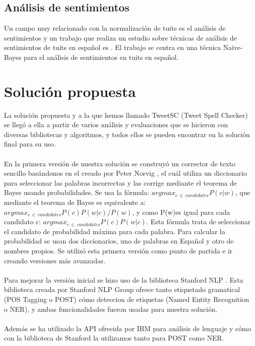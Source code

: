 \documentclass[spanish,12pt, a4paper,twoside]{paper}
\let\oldsection\section
\def\section{\cleardoublepage\oldsection}
\begin{document}
\subsection{Análisis de sentimientos}\label{analisisdesentimientos}
Un campo muy relacionado con la normalización de tuits es el análisis de sentimientos y un trabajo que realiza un estudio sobre técnicas de análisis de sentimientos de tuits en español es \cite{fernandezanta:2013}. El trabajo \cite{gamallo:2013} se centra en una técnica Naive-Bayes para el análisis de sentimientos en tuits en español.

\section{Solución propuesta}\label{sec:solucionpropuesta}
La solución propuesta y a la que hemos llamado TweetSC (Tweet Spell Checker) \cite{tweetscweb} se llegó a ella a partir de varios análisis y evaluaciones que se hicieron con diversas bibliotecas y algoritmos, y todos ellos se pueden encontrar en la solución final para su uso.\\\\
En la primera versión de nuestra solución se construyó un corrector de texto sencillo basándonos en el creado por Peter Norvig \cite{peternorvig}, el cuál utiliza un diccionario para seleccionar las palabras incorrectas y las corrige mediante el teorema de Bayes usando probabilidades. Se usa la fórmula: $argmax_{c\ \in\  candidates}P(c|w)$, que mediante el teorema de Bayes es equivalente a: $argmax_{c\ \in\  candidates}P(c) P(w|c) / P(w)$, y como P(w)es igual para cada candidato c: $argmax_{c\ \in\  candidates}P(c) P(w|c)$. Esta fórmula trata de seleccionar el candidato de probabilidad máxima para cada palabra. Para calcular la probabilidad se usan dos diccionarios, uno de palabras en Español y otro de nombres propios. Se utilizó esta primera versión como punto de partida e ir creando versiones más avanzadas.\\\\
Para mejorar la versión inicial se hizo uso de la biblioteca Stanford NLP \cite{stanfordnlp}. Esta biblioteca creada por Stanford NLP Group ofrece tanto etiquetado gramatical (POS Tagging o POST) cómo deteccion de etiquetas (Named Entity Recognition o NER), y ambas funcionalidades fueron usadas para nuestra solución.\\\\
Además se ha utilizado la API ofrecida por IBM \cite{ibmwatsonnlu} para análisis de lenguaje y cómo con la biblioteca de Stanford la utilizamos tanto para POST como NER.\\\\
\end{document}
